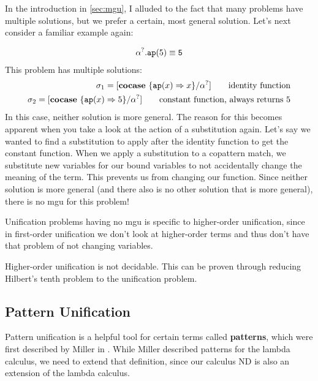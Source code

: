 \documentclass[twoside,12pt,a4paper]{article}
\begin{document}
In the introduction in \cref{sec:mgu}, I alluded to the fact that many problems have multiple solutions, but we prefer a certain, most general solution.
Let's next consider a familiar example again:
\begin{example}
    \begin{align*}
        \alpha^?.\texttt{ap}(5) \equiv \texttt{5}
    \end{align*}
    This problem has multiple solutions:
    \begin{align*}
        \sigma_1 = [\textbf{cocase}\ \{\texttt{ap}(x)\Rightarrow x\} / \alpha^?]\tag*{identity function}\\
        \sigma_2 = [\textbf{cocase}\ \{\texttt{ap}(x)\Rightarrow 5\} / \alpha^?]\tag*{constant function, always returns 5}
    \end{align*}
    In this case, neither solution is more general. The reason for this becomes apparent when you take a look at the action of a substitution again. 
Let's say we wanted to find a substitution to apply after the identity function to get the constant function. 
When we apply a substitution to a copattern match, we substitute new variables for our bound variables to not accidentally change the meaning of the term.
This prevents us from changing our function. 
Since neither solution is more general (and there also is no other solution that is more general),
there is no mgu for this problem!
\end{example}

Unification problems having no mgu is specific to higher-order unification, since in first-order unification we don't look at 
higher-order terms and thus don't have that problem of not changing variables.

\begin{theorem}
    Higher-order unification is not decidable. This can be proven through reducing Hilbert's tenth problem to the unification problem.%
\end{theorem} %

\subsection{Pattern Unification}

Pattern unification is a helpful tool for certain terms called \textbf{patterns}, which were first described by Miller in \cite{10.1093/logcom/1.4.497}.
While Miller described patterns for the lambda calculus, we need to extend that definition, since our calculus ND is also an extension of the lambda calculus. 
\end{document}
